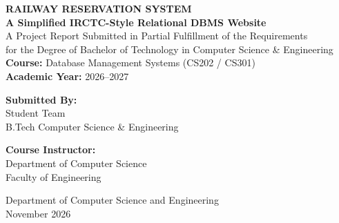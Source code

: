 \documentclass[12pt,a4paper]{report}
\begin{document}
\begin{titlepage}
    \centering
    \vspace*{0.5cm}
    {\Huge\textbf{\color{primary} RAILWAY RESERVATION SYSTEM}}\\[0.4cm]
    {\Large\textbf{\color{accent} A Simplified IRCTC-Style Relational DBMS Website}}\\[1.5cm]
    
    {\large A Project Report Submitted in Partial Fulfillment of the Requirements\\
    for the Degree of Bachelor of Technology in Computer Science \& Engineering}\\[1.5cm]
    
    \textbf{Course:} Database Management Systems (CS202 / CS301)\\[0.5cm]
    \textbf{Academic Year:} 2026--2027\\[2.0cm]
    
    \begin{minipage}{0.45\textwidth}
        \begin{flushleft} \large
            \textbf{Submitted By:}\\
            Student Team\\
            B.Tech Computer Science \& Engineering
        \end{flushleft}
    \end{minipage}
    \hfill
    \begin{minipage}{0.45\textwidth}
        \begin{flushright} \large
            \textbf{Course Instructor:}\\
            Department of Computer Science\\
            Faculty of Engineering
        \end{flushright}
    \end{minipage}
    
    \vfill
    {\large Department of Computer Science and Engineering}\\[0.2cm]
    {\large November 2026}
\end{titlepage}

\end{document}
